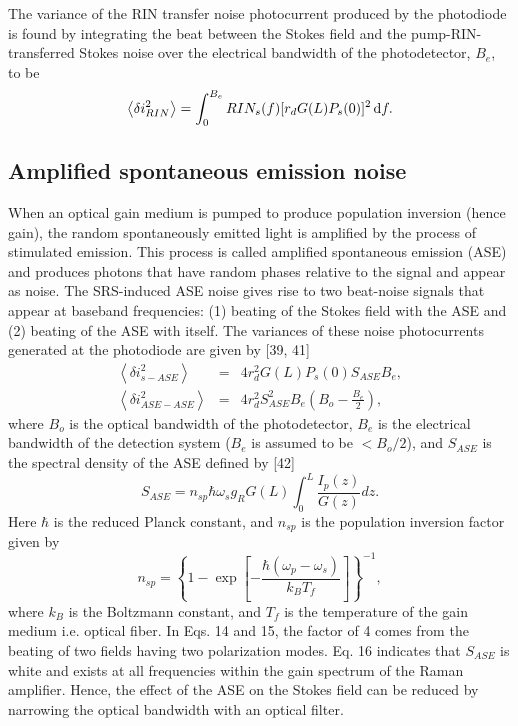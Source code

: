 The variance of the RIN transfer noise photocurrent produced by the photodiode is found by integrating the beat between the Stokes field and the pump-RIN-transferred Stokes noise over the electrical bandwidth of the photodetector, $B_e$, to be
\begin{equation}
\left\langle \delta i_{RIN}^2\right\rangle = \int_0^{B_e}RIN_s(f) [r_d G(L) P_s(0)]^2 \,\mathrm{d} f.
\end{equation}

\subsection{Amplified spontaneous emission noise}

When an optical gain medium is pumped to produce population inversion (hence gain), the random spontaneously emitted light is amplified by the process of stimulated emission. This process is called amplified spontaneous emission (ASE) and produces photons that have random phases relative to the signal and appear as noise. The SRS-induced ASE noise gives rise to two beat-noise signals that appear at baseband frequencies: (1) beating of the Stokes field with the ASE and (2) beating of the ASE with itself. The variances of these noise photocurrents generated at the photodiode are given by [39, 41]
\begin{eqnarray}
\left\langle \delta i_{s-ASE}^2\right\rangle &=& 4 r_d^2 G(L) P_s(0) S_{ASE} B_e, \\
\left\langle \delta i_{ASE-ASE}^2\right\rangle &=& 4 r_d^2 S_{ASE}^2 B_e \left(B_o-\frac{B_e}{2}\right),
\end{eqnarray}
where $B_o$ is the optical bandwidth of the photodetector, $B_e$ is the electrical bandwidth of the detection system ($B_e$ is assumed to be $< B_o/2$), and $S_{ASE}$ is the spectral density of the ASE defined by [42]
\begin{equation}
S_{ASE} = n_{sp} \hbar \omega_s g_R G(L) \int_0^L {\frac{I_p(z)}{G(z)} dz}.
\end{equation}
Here $\hbar$ is the reduced Planck constant, and $n_{sp}$ is the population inversion factor given by
\begin{equation}
n_{sp}=\left\{1-\exp\left[-\frac{\hbar (\omega_p-\omega_s)}{k_B T_f}\right]\right\}^{-1},
\end{equation}
where $k_B$ is the Boltzmann constant, and $T_f$ is the temperature of the gain medium i.e. optical fiber. In Eqs. 14 and 15, the factor of 4 comes from the beating of two fields having two polarization modes. Eq. 16 indicates that $S_{ASE}$ is white and exists at all frequencies within the gain spectrum of the Raman amplifier. Hence, the effect of the ASE on the Stokes field can be reduced by narrowing the optical bandwidth with an optical filter.

